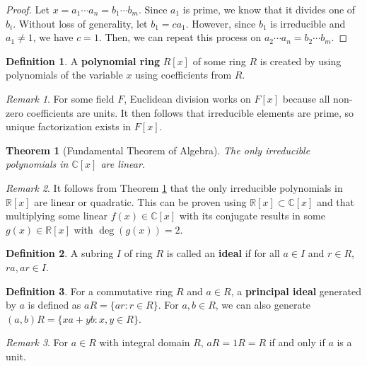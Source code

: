 \documentclass[
    parskip=half,
    toc=flat,
    toc=sectionentrydotfill,
]{scrartcl}  %
\theoremstyle{definition}
\newtheorem{definition}{Definition}[section]
\theoremstyle{plain}
\newtheorem{theorem}{Theorem}[definition]
\theoremstyle{remark}
\newtheorem{remark}{Remark}[definition]
\begin{document}
\begin{proof}
    Let $x=a_1\cdots a_n=b_1\cdots b_m$.
    Since $a_1$ is prime, we know that it divides one of $b_i$.
    Without loss of generality, let $b_1=ca_1$.
    However, since $b_1$ is irreducible and $a_1\neq 1$, we have $c=1$.
    Then, we can repeat this process on $a_2\cdots a_n=b_2\cdots b_m$.
\end{proof}

\begin{definition}
    A \textbf{polynomial ring} $R[x]$ of some ring $R$ is created by using
    polynomials of the variable $x$ using coefficients from $R$.
\end{definition}

\begin{remark}
    For some field $F$, Euclidean division works on $F[x]$ because all non-zero
    coefficients are units.
    It then follows that irreducible elements are prime, so unique factorization
    exists in $F[x]$.
\end{remark}

\begin{theorem}[Fundamental Theorem of Algebra]
    \label{thm:fundamental theorem of algebra}
    The only irreducible polynomials in $\mathbb{C}[x]$ are linear.
\end{theorem}

\begin{remark}
    It follows from Theorem \ref{thm:fundamental theorem of algebra} that the
    only irreducible polynomials in $\mathbb{R}[x]$ are linear or quadratic.
    This can be proven using $\mathbb{R}[x]\subset\mathbb{C}[x]$ and that
    multiplying some linear $f(x)\in\mathbb{C}[x]$ with its conjugate results
    in some $g(x)\in\mathbb{R}[x]$ with $\deg(g(x))=2$.
\end{remark}

\begin{definition}
    A subring $I$ of ring $R$ is called an \textbf{ideal} if for all
    $a\in I$ and $r\in R$, $ra,ar\in I$.
\end{definition}

\begin{definition}
    For a commutative ring $R$ and $a\in R$, a \textbf{principal ideal}
    generated by $a$ is defined as $aR=\{ar:r\in R\}$.
    For $a,b\in R$, we can also generate $(a,b)R=\{xa+yb:x,y\in R\}$.
\end{definition}

\begin{remark}
    For $a\in R$ with integral domain $R$, $aR=1R=R$ if and only if $a$ is a
    unit.
\end{remark}
\end{document}

